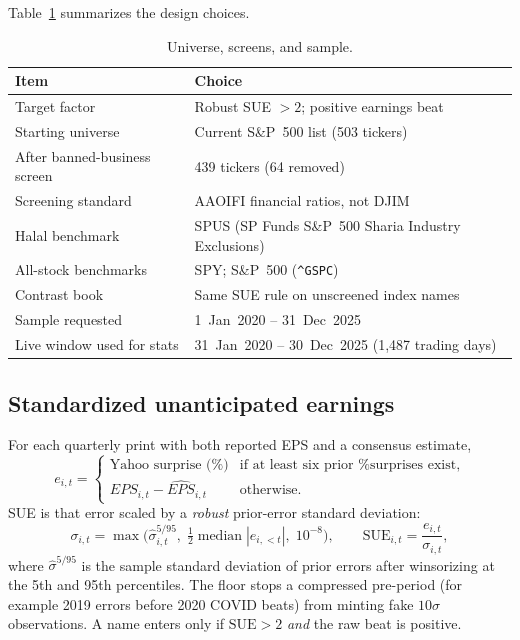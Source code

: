 \documentclass[11pt,letterpaper]{article}
\begin{document}
Table~\ref{tab:universe} summarizes the design choices.

\begin{table}[htbp]
\centering
\caption{Universe, screens, and sample.}
\label{tab:universe}
\begin{tabular}{ll}
\toprule
Item & Choice \\
\midrule
Target factor & Robust SUE $> 2$; positive earnings beat \\
Starting universe & Current S\&P~500 list (503 tickers) \\
After banned-business screen & 439 tickers (64 removed) \\
Screening standard & AAOIFI financial ratios, not DJIM \\
Halal benchmark & SPUS (SP Funds S\&P~500 Sharia Industry Exclusions) \\
All-stock benchmarks & SPY; S\&P~500 (\texttt{\^{}GSPC}) \\
Contrast book & Same SUE rule on unscreened index names \\
Sample requested & 1~Jan~2020 -- 31~Dec~2025 \\
Live window used for stats & 31~Jan~2020 -- 30~Dec~2025 (1{,}487 trading days) \\
\bottomrule
\end{tabular}
\end{table}

\subsection{Standardized unanticipated earnings}

For each quarterly print with both reported EPS and a consensus estimate,
\[
e_{i,t} =
\begin{cases}
\text{Yahoo surprise (\%)} & \text{if at least six prior \% surprises exist,} \\
EPS_{i,t} - \widehat{EPS}_{i,t} & \text{otherwise.}
\end{cases}
\]
SUE is that error scaled by a \emph{robust} prior-error standard deviation:
\[
\sigma_{i,t}
= \max\bigl(
\widehat{\sigma}_{i,t}^{5/95},\;
\tfrac{1}{2}\operatorname{median}|e_{i,<t}|,\;
10^{-8}
\bigr),
\qquad
\mathrm{SUE}_{i,t} = \frac{e_{i,t}}{\sigma_{i,t}},
\]
where $\widehat{\sigma}^{5/95}$ is the sample standard deviation of prior errors after winsorizing at the 5th and 95th percentiles. The floor stops a compressed pre-period (for example 2019 errors before 2020 COVID beats) from minting fake $10\sigma$ observations. A name enters only if $\mathrm{SUE}>2$ \emph{and} the raw beat is positive.
\end{document}
